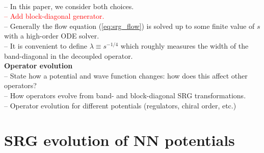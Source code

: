 \documentclass[preprintnumbers,floatfix,aps,prc,preprint,nofootinbib]{revtex4-1}
\begin{document}
\\
-- In this paper, we consider both choices.
\\
\textcolor{red}{%
-- Add block-diagonal generator.
}
\\
-- Generally the flow equation (\ref{eq:srg_flow}) is solved up to some finite value of $s$ with a high-order ODE solver.
\\
-- It is convenient to define $\lambda \equiv s^{-1/4}$ which roughly measures the width of the band-diagonal in the decoupled operator.
\\
\textbf{Operator evolution}
\\
-- State how a potential and wave function changes: how does this affect other operators?
\\
-- How operators evolve from band- and block-diagonal SRG transformations.
\\
-- Operator evolution for different potentials (regulators, chiral order, etc.)


\section{SRG evolution of NN potentials}
\label{sec:srg_evolution_nn_potentials}
\end{document}
